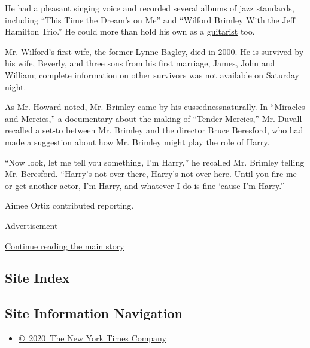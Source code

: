 He had a pleasant singing voice and recorded several albums of jazz
standards, including ``This Time the Dream's on Me'' and ``Wilford
Brimley With the Jeff Hamilton Trio.'' He could more than hold his own
as a \href{https://www.youtube.com/watch?v=WAft2naOgGc}{guitarist} too.

Mr. Wilford's first wife, the former Lynne Bagley, died in 2000. He is
survived by his wife, Beverly, and three sons from his first marriage,
James, John and William; complete information on other survivors was not
available on Saturday night.

As Mr. Howard noted, Mr. Brimley came by his
\href{https://www.youtube.com/watch?v=DLqX7Vi9yT8\&list=PLy1Yuw2wBXtCMd3A4mbt2x4Z8ty3S_YFF}{cussedness}naturally.
In ``Miracles and Mercies,'' a documentary about the making of ``Tender
Mercies,'' Mr. Duvall recalled a set-to between Mr. Brimley and the
director Bruce Beresford, who had made a suggestion about how Mr.
Brimley might play the role of Harry.

``Now look, let me tell you something, I'm Harry,'' he recalled Mr.
Brimley telling Mr. Beresford. ``Harry's not over there, Harry's not
over here. Until you fire me or get another actor, I'm Harry, and
whatever I do is fine `cause I'm Harry.''

Aimee Ortiz contributed reporting.

Advertisement

\protect\hyperlink{after-bottom}{Continue reading the main story}

\hypertarget{site-index}{%
\subsection{Site Index}\label{site-index}}

\hypertarget{site-information-navigation}{%
\subsection{Site Information
Navigation}\label{site-information-navigation}}

\begin{itemize}
\tightlist
\item
  \href{https://help.nytimes.com/hc/en-us/articles/115014792127-Copyright-notice}{©~2020~The
  New York Times Company}
\end{itemize}

